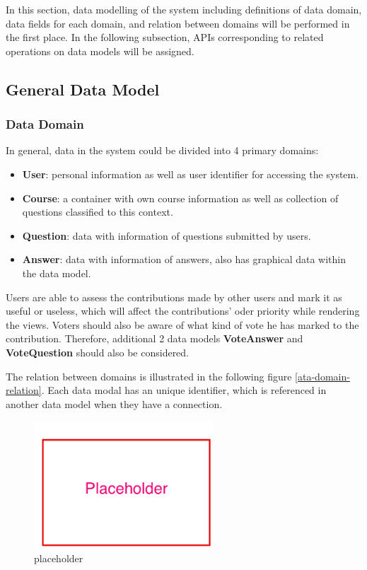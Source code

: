 In this section, data modelling of the system including definitions of data domain, data fields for each domain, and relation between domains will be performed in the first place. In the following subsection, APIs corresponding to related operations on data models will be assigned.

\subsection{General Data Model}


\subsubsection{ Data Domain }
In general, data in the system could be divided into 4 primary domains:

\begin{itemize}
\item
\textbf{User}: personal information as well as user identifier for accessing the system.
\item
\textbf{Course}: a container with own course information as well as collection of questions classified to this context.
\item
\textbf{Question}:  data with information of questions submitted by users.
\item
\textbf{Answer}: data with information of answers, also has graphical data within the data model.

\end{itemize}

Users are able to assess the contributions made by other users and mark it as useful or useless, which will affect the contributions' oder priority while rendering the views. Voters should also be aware of what kind of vote he has marked to the contribution. Therefore, additional 2 data models \textbf{VoteAnswer} and \textbf{VoteQuestion} should also be considered. 

The relation between domains is illustrated in the following figure \ref{ata-domain-relation}. Each data modal has an unique identifier, which is referenced in another data model when they have a connection. 

\begin{figure}[!htbp]
  \centering
    \includegraphics[width=0.6\textwidth]{Figures/placeholder.png}
  \caption{placeholder}
  \label{fig:data-domain-relation}
\end{figure}



